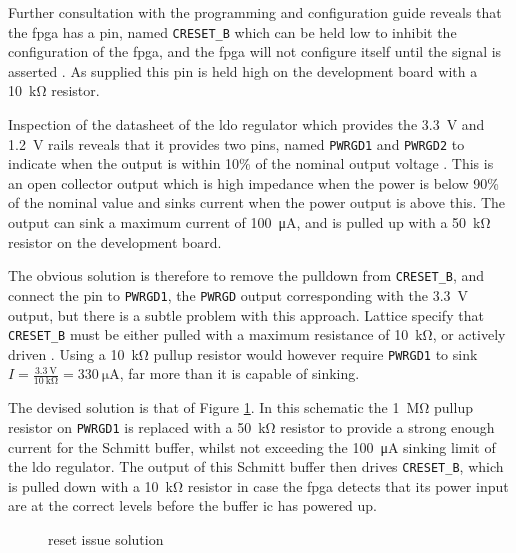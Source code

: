 Further consultation with the programming and configuration guide reveals that the \gls{fpga} has a pin, named \texttt{CRESET\_B} which can be held low to inhibit the configuration of the \gls{fpga}, and the \gls{fpga} will not configure itself until the signal is asserted \cite[p.4]{lattice2016}. As supplied this pin is held high on the development board with a \SI{10}{\kilo\ohm} resistor.

Inspection of the datasheet of the \gls{ldo} regulator which provides the \SI{3.3}{\volt} and \SI{1.2}{\volt} rails reveals that it provides two pins, named \texttt{PWRGD1} and \texttt{PWRGD2} to indicate when the output is within 10\% of the nominal output voltage \cite[p.11]{linear2013}. This is an open collector output which is high impedance when the power is below 90\% of the nominal value and sinks current when the power output is above this. The output can sink a maximum current of \SI{100}{\micro\ampere}, and is pulled up with a \SI{50}{\kilo\ohm} resistor on the development board.

The obvious solution is therefore to remove the pulldown from \texttt{CRESET\_B}, and connect the pin to \texttt{PWRGD1}, the \texttt{PWRGD} output corresponding with the \SI{3.3}{\volt} output, but there is a subtle problem with this approach. Lattice specify that \texttt{CRESET\_B} must be either pulled with a maximum resistance of \SI{10}{\kilo\ohm}, or actively driven \cite[p4-1]{lattice2017}. Using a \SI{10}{\kilo\ohm} pullup resistor would however require \texttt{PWRGD1} to sink $I=\frac{\SI{3.3}{\volt}}{\SI{10}{\kilo\ohm}}= \SI{330}{\micro\ampere}$, far more than it is capable of sinking.

The devised solution is that of Figure \ref{fig:fpga-reset-sol}. In this schematic the \SI{1}{\mega\ohm} pullup resistor on \texttt{PWRGD1} is replaced with a \SI{50}{\kilo\ohm} resistor to provide a strong enough current for the Schmitt buffer, whilst not exceeding the \SI{100}{\micro\ampere} sinking limit of the \gls{ldo} regulator. The output of this Schmitt buffer then drives \texttt{CRESET\_B}, which is pulled down with a \SI{10}{\kilo\ohm} resistor in case the \gls{fpga} detects that its power input are at the correct levels before the buffer \gls{ic} has powered up.


\begin{figure}[ht]
	\centering
	\caption{ reset issue solution }
	\label{fig:fpga-reset-sol}
\end{figure}


